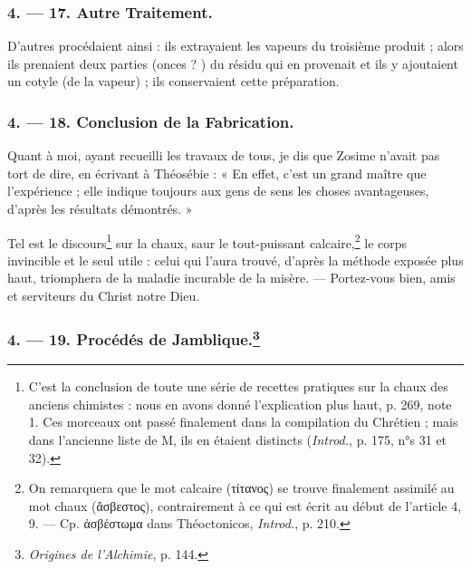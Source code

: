 \documentclass[a4paper, 11pt, oneside, polutonikogreek, french]{article}
\begin{document}
\bigskip
\centerline{\EightStarTaper}
\centerline{\EightStarTaper\EightStarTaper}
\bigskip

\subsubsection{4. --- 17. Autre Traitement.}

D'autres procédaient ainsi : ils extrayaient les vapeurs du troisième produit ; alors ils prenaient deux parties (onces ? ) du résidu qui en provenait et ils y ajoutaient un cotyle (de la vapeur) ; ils conservaient cette préparation.

\bigskip
\centerline{\EightStarTaper}
\centerline{\EightStarTaper\EightStarTaper}
\bigskip

\subsubsection{4. --- 18. Conclusion de la Fabrication.}

Quant à moi, ayant recueilli les travaux de tous, je dis que Zosime n'avait pas tort de dire, en écrivant à Théosébie : « En effet, c'est un grand maître que l'expérience ; elle indique toujours aux gens de sens les choses avantageuses, d'après les résultats démontrés. »

Tel est le discours\footnote{C'est la conclusion de toute une série de recettes pratiques sur la chaux des anciens chimistes : nous en avons donné l'explication plus haut, p. 269, note 1. Ces morceaux ont passé finalement dans la compilation du Chrétien ; mais dans l'ancienne liste de M, ils en étaient distincts (\emph{Introd.}, p. 175, n°s 31 et 32).} sur la chaux, saur le tout-puissant calcaire,\footnote{On remarquera que le mot calcaire (τίτανος) se trouve finalement assimilé au mot chaux (ἄσβεστος), contrairement à ce qui est écrit au début de l'article 4, 9. --- Cp. ἀσβέστωμα dans Théoctonicos, \emph{Introd.}, p. 210.} le corps invincible et le seul utile : celui qui l'aura trouvé, d'après la méthode exposée plus haut, triomphera de la maladie incurable de la misère. --- Portez-vous bien, amis et serviteurs du Christ notre Dieu.

\subsubsection[4. --- 19. Procédés de Jamblique.]{4. --- 19. Procédés de Jamblique.\footnote{\emph{Origines de l'Alchimie}, p. 144.}}
\end{document}
